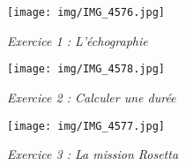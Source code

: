 \documentclass[a4paper,12pt]{article}
\begin{document}
\begin{figure}[H]
  \centering
  \texttt{[image: img/IMG\_4576.jpg]}
  \captionsetup{labelformat=empty}
  \caption{\label{} \textit{Exercice 1 : L'échographie}}
\end{figure}


\begin{figure}[H]
  \centering
  \texttt{[image: img/IMG\_4578.jpg]}
  \captionsetup{labelformat=empty}
  \caption{\label{} \textit{Exercice 2 : Calculer une durée}}
\end{figure}

\begin{figure}[H]
  \centering
  \texttt{[image: img/IMG\_4577.jpg]}
  \captionsetup{labelformat=empty}
  \caption{\label{} \textit{Exercice 3 : La mission Rosetta}}
\end{figure}
\end{document}
